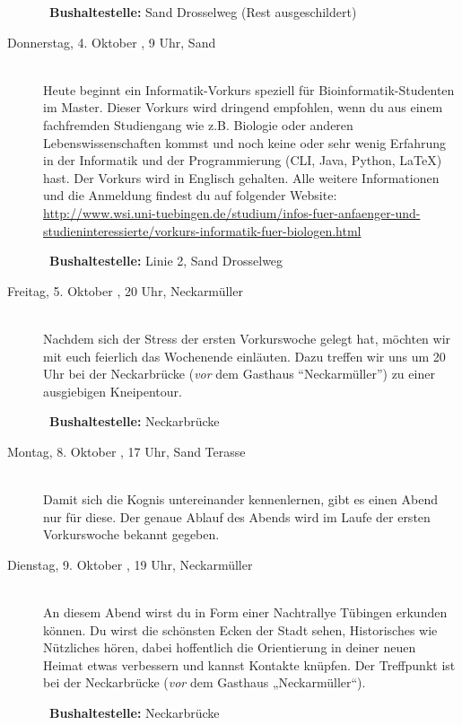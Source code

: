 \begin{description}
~\textbf{Bushaltestelle:} Sand Drosselweg (Rest ausgeschildert)

\ifmaster
\ifbinfo
\item[Donnerstag, 4. Oktober \Jahr, 9 Uhr, Sand]\ \\
 Heute beginnt ein Informatik-Vorkurs speziell für Bioinformatik-Studenten im Master. Dieser Vorkurs wird dringend empfohlen, wenn du aus einem fachfremden Studiengang wie z.B. Biologie oder anderen Lebenswissenschaften kommst und noch keine oder sehr wenig Erfahrung in der Informatik und der Programmierung (CLI, Java, Python, \LaTeX) hast. Der Vorkurs wird in Englisch gehalten. Alle weitere Informationen und die Anmeldung findest du auf folgender Website: \\ \url{http://www.wsi.uni-tuebingen.de/studium/infos-fuer-anfaenger-und-studieninteressierte/vorkurs-informatik-fuer-biologen.html}

~\textbf{Bushaltestelle:} Linie 2, Sand Drosselweg
\fi
\fi


\item[Freitag, 5. Oktober \Jahr, 20 Uhr, Neckarmüller]\ \\
Nachdem sich der Stress der ersten Vorkurswoche gelegt hat, möchten wir mit euch feierlich das Wochenende einläuten.
Dazu treffen wir uns um 20 Uhr bei der Neckarbrücke (\emph{vor} dem Gasthaus "`Neckarmüller"') zu einer ausgiebigen Kneipentour.

~\textbf{Bushaltestelle:} Neckarbrücke


\ifkogwiss

\item[Montag, 8. Oktober \Jahr, 17 Uhr, Sand Terasse ]\ \\
Damit sich die Kognis untereinander kennenlernen, gibt es einen Abend nur für diese. Der genaue Ablauf des Abends wird im Laufe der ersten Vorkurswoche bekannt gegeben.
\fi

\item[Dienstag, 9. Oktober \Jahr, 19 Uhr, Neckarmüller]\ \\
An diesem Abend wirst du in Form einer Nachtrallye Tübingen erkunden können. Du wirst die schönsten Ecken der Stadt sehen, Historisches wie Nützliches hören, dabei hoffentlich die Orientierung in deiner neuen Heimat etwas verbessern und kannst Kontakte knüpfen. Der Treffpunkt ist bei der Neckarbrücke (\emph{vor} dem Gasthaus „Neckarmüller“).

~\textbf{Bushaltestelle:} Neckarbrücke


\end{description}
